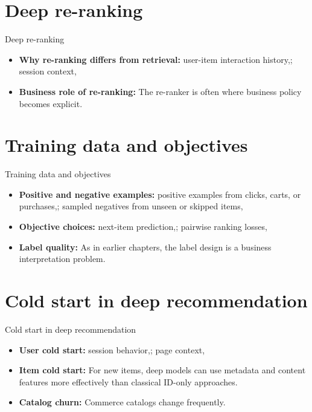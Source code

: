 \documentclass[aspectratio=169]{beamer}
\begin{document}
\section{Deep re-ranking}

\begin{frame}{Deep re-ranking}
  \begin{itemize}
    \item \textbf{Why re-ranking differs from retrieval:} user-item interaction history,; session context,
    \item \textbf{Business role of re-ranking:} The re-ranker is often where business policy becomes explicit.
  \end{itemize}
\end{frame}

\section{Training data and objectives}

\begin{frame}{Training data and objectives}
  \begin{itemize}
    \item \textbf{Positive and negative examples:} positive examples from clicks, carts, or purchases,; sampled negatives from unseen or skipped items,
    \item \textbf{Objective choices:} next-item prediction,; pairwise ranking losses,
    \item \textbf{Label quality:} As in earlier chapters, the label design is a business interpretation problem.
  \end{itemize}
\end{frame}

\section{Cold start in deep recommendation}

\begin{frame}{Cold start in deep recommendation}
  \begin{itemize}
    \item \textbf{User cold start:} session behavior,; page context,
    \item \textbf{Item cold start:} For new items, deep models can use metadata and content features more effectively than classical ID-only approaches.
    \item \textbf{Catalog churn:} Commerce catalogs change frequently.
  \end{itemize}
\end{frame}
\end{document}
